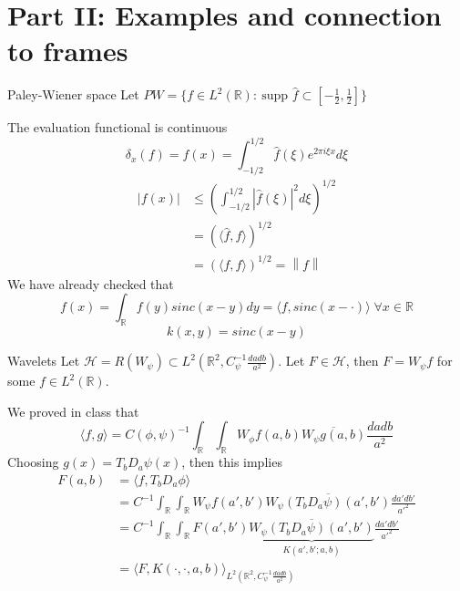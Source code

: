 \documentclass[10pt]{beamer}
\theoremstyle{definition} %
\newcommand{\norm}[1]{\left\lVert#1\right\rVert}
\begin{document}
\section{Part II: Examples and connection to frames}
\begin{frame}{Paley-Wiener space}
    Let $PW = \{f \in L^2(\mathbb{R}) : \ \text{supp } \hat f \subset [-\frac{1}{2}, \frac{1}{2}]\}$

    The evaluation functional is continuous
   $$\delta_x(f) = f(x) = \int_{-1/2}^{1/2} \hat f (\xi) e^{2\pi i \xi x} d\xi$$
   \[ 
   \begin{split}
   |f(x)| & \leq \left(\int_{-1/2}^{1/2} |\hat f (\xi)|^2 d\xi \right)^{1/2} \\
   & = (\langle \hat f, \hat f \rangle)^{1/2} \\
   & = (\langle  f,  f \rangle)^{1/2} = \norm{f}
   \end{split}
   \]
   We have already checked that
   $$ f(x) = \int_{\mathbb{R}} f(y) sinc(x-y) dy = \langle f, sinc(x - \cdot) \rangle \; \forall x \in \mathbb{R}$$
   $$\boxed{k(x,y) = sinc(x-y)}$$
    
\end{frame}
\begin{frame}{Wavelets}
    Let $\mathcal{H} = R(W_\psi) \subset L^2(\mathbb{R}^2, C_\psi^{-1}\frac{da db}{a^2})$. Let $F \in \mathcal{H}$, then $F = W_\psi f$ for some $f \in L^2(\mathbb{R})$.
    
    We proved in class that 
    $$ \langle f, g \rangle = C(\phi, \psi)^{-1} \int_\mathbb{R}\int_\mathbb{R} {W_\phi f(a,b)} \overline{W_\psi g(a,b)} \frac{da db}{a^2} $$
    Choosing $g(x) = T_b D_a \psi (x)$, then this implies
    \[
    \begin{split}
F(a,b) & = \langle f, T_b D_a \phi \rangle  \\
 & = C^{-1} \int_\mathbb{R} \int_\mathbb{R} W_\psi f (a',b') \overline{W_\psi (T_b D_a \psi) (a',b')} \frac{da' db'}{a'^2} \\
 & = C^{-1} \int_\mathbb{R} \int_\mathbb{R} F(a',b') \overline{\underbrace{W_\psi (T_b D_a \psi) (a',b')}_{K(a',b'; a,b)}} \frac{da' db'}{a'^2} \\
 & = \langle  F, K(\cdot, \cdot, a, b) \rangle_{L^2(\mathbb{R}^2, C_\psi^{-1}\frac{da db}{a^2})}
\end{split}
    \]
\end{frame}
\end{document}
